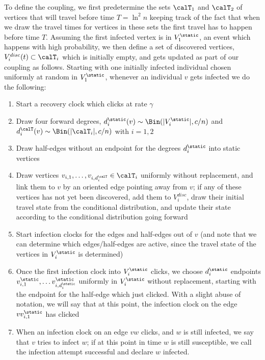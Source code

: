 \documentclass[11pt]{article}
\begin{document}
To define the coupling, we first predetermine the sets $\calT_1$ and $\calT_2$ of vertices that will travel before time $T=\ln^2 n$ keeping track of the fact that when we draw the travel times for vertices in these sets the first travel has to happen before time $T$.  Assuming the first infected vertex is in $V_1^\static$, an event which happens with high probability, we then define a set of discovered vertices, $V_i^{disc}(t)\subset \calT_i$
which is initially empty, and gets updated as part of our coupling as follows. Starting with one initially infected individual chosen uniformly at random in $V_1^\static$, whenever an individual $v$ gets infected we do the following:
 \begin{enumerate}
        \item Start a recovery clock which clicks at rate $\gamma$
        \item\label{forward-degree} Draw four forward degrees, $d_i^\static(v)\sim \Bin (|V_i^\static|,c/n)$ and $d_i^{\calT}(v)\sim \Bin(|\calT_i|,c/n)$ with $i=1,2$
        \item Draw half-edges without an endpoint for the  degrees $d_i^\static$ into static vertices 
        \item\label{discovery-step} Draw vertices $v_{i,1},\dots,v_{i,d_i^\calT}\in \calT_i$
        uniformly without replacement, and link them to $v$ by an oriented edge pointing away from $v$; if any of these vertices has not yet been discovered, add them to
        $V_i^{disc}$,  draw their initial travel state from the conditional distribution, and update their state according to the conditional distribution going forward
\item Start infection clocks for the edges and half-edges out of $v$ (and note that we can determine which edges/half-edges are active, since the travel state of the vertices in $V_i^\static$ is determined)
     \item Once the first infection clock into $V_i^\static$ clicks, we choose $d_i^\static$ endpoints $v_{i,1}^\static,\dots v_{i,d_i^\static}^\static$ uniformly in $V_i^\static$ without replacement, starting with the endpoint for the half-edge which just clicked.  With a slight abuse of notation, we will say that at this point, the infection clock on the edge $vv_{i,1}^\static$ has clicked
    \item When an infection clock on an edge $vw$ clicks, and $w$ is still infected, we say that $v$ tries to infect $w$; if at this point in time $w$ is still susceptible, we call the infection attempt successful and declare $w$ infected.
\end{enumerate}
\end{document}
